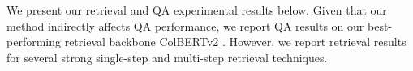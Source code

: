 \documentclass{article}
\begin{document}
We present our retrieval and QA experimental results below. Given that our method indirectly affects QA performance, we report QA results on our best-performing retrieval backbone ColBERTv2 \cite{colbertv2}. However, we report retrieval results for several strong single-step and multi-step retrieval techniques. 

\end{document}
